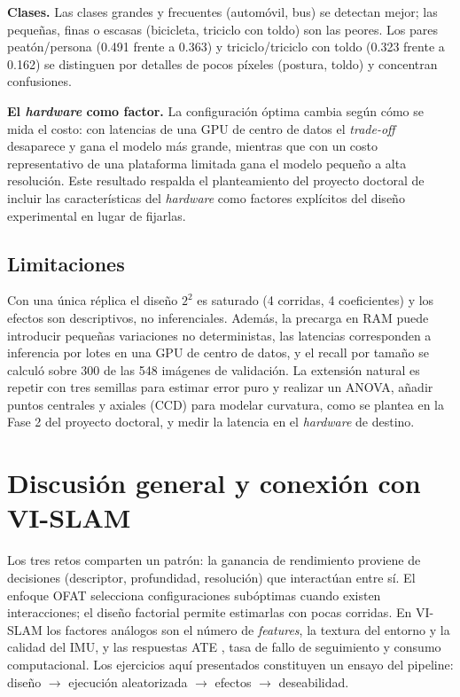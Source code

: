 \documentclass[conference]{IEEEtran}
\begin{document}
\textbf{Clases.} Las clases grandes y frecuentes (automóvil, bus) se detectan mejor; las pequeñas, finas o escasas (bicicleta, triciclo con toldo) son las peores. Los pares peatón/persona (0.491 frente a 0.363) y triciclo/triciclo con toldo (0.323 frente a 0.162) se distinguen por detalles de pocos píxeles (postura, toldo) y concentran confusiones.

\textbf{El \emph{hardware} como factor.} La configuración óptima cambia según cómo se mida el costo: con latencias de una GPU de centro de datos el \emph{trade-off} desaparece y gana el modelo más grande, mientras que con un costo representativo de una plataforma limitada gana el modelo pequeño a alta resolución. Este resultado respalda el planteamiento del proyecto doctoral de incluir las características del \emph{hardware} como factores explícitos del diseño experimental en lugar de fijarlas.

\subsection{Limitaciones}
Con una única réplica el diseño $2^2$ es saturado (4 corridas, 4 coeficientes) y los efectos son descriptivos, no inferenciales. Además, la precarga en RAM puede introducir pequeñas variaciones no deterministas, las latencias corresponden a inferencia por lotes en una GPU de centro de datos, y el recall por tamaño se calculó sobre 300 de las 548 imágenes de validación. La extensión natural es repetir con tres semillas para estimar error puro y realizar un ANOVA, añadir puntos centrales y axiales (CCD) para modelar curvatura, como se plantea en la Fase 2 del proyecto doctoral, y medir la latencia en el \emph{hardware} de destino.

\section{Discusión general y conexión con VI-SLAM}
Los tres retos comparten un patrón: la ganancia de rendimiento proviene de decisiones (descriptor, profundidad, resolución) que interactúan entre sí. El enfoque OFAT selecciona configuraciones subóptimas cuando existen interacciones; el diseño factorial permite estimarlas con pocas corridas. En VI-SLAM los factores análogos son el número de \emph{features}, la textura del entorno y la calidad del IMU, y las respuestas ATE \cite{sturm2012}, tasa de fallo de seguimiento y consumo computacional. Los ejercicios aquí presentados constituyen un ensayo del pipeline: diseño $\to$ ejecución aleatorizada $\to$ efectos $\to$ deseabilidad.
\end{document}

